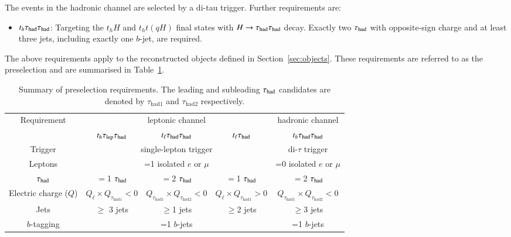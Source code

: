 The events in the hadronic channel are selected by a di-tau trigger. Further requirements are:
\begin{itemize}
\item $t_h\tau_{\mathrm{had}} \tau_{\mathrm{had}}$: Targeting the $t_hH$ and $t_ht(qH)$ final states with $H\rightarrow\tau_{\mathrm{had}} \tau_{\mathrm{had}}$ decay. Exactly two $\tau_{\mathrm{had}}$ with opposite-sign charge and at least three jets, including exactly one $b$-jet, are required.
\end{itemize}

The above requirements apply to the reconstructed objects defined in Section~\ref{sec:objects}.
These requirements are referred to as the preselection and are summarised in Table~\ref{tab:preselection}. 

\begin{table*}[t!]
\caption{\small{Summary of preselection requirements. 
The leading and subleading $\tau_{\mathrm{had}}$ candidates are denoted by $\tau_{\mathrm{had1}}$ and $\tau_{\mathrm{had2}}$ respectively.}}
\begin{center}
\begin{tabular}{c|ccc|c}
\toprule\toprule
\multirow{2}{*}{Requirement} &  \multicolumn{3}{c|}{leptonic channel}  & \multicolumn{1}{c}{hadronic channel} \\ 
& $t_h\tau_{\mathrm{lep}} \tau_{\mathrm{had}}$ & $t_{\ell}\tau_{\mathrm{had}} \tau_{\mathrm{had}}$ &  $t_{\ell}\tau_{\mathrm{had}}$ & $t_h\tau_{\mathrm{had}} \tau_{\mathrm{had}}$\\
\midrule
Trigger & \multicolumn{3}{c|}{single-lepton trigger} & di-$\tau$ trigger  \\
Leptons  & \multicolumn{3}{c|}{=1 isolated $e$ or $\mu$}  & =0 isolated $e$ or $\mu$ \\
$\tau_{\mathrm{had}}$  & $=$1 $\tau_{\mathrm{had}}$ & $=$2 $\tau_{\mathrm{had}}$ & $=$1 $\tau_{\mathrm{had}}$ & $=$2 $\tau_{\mathrm{had}}$ \\
Electric charge ($Q$) & $Q_\ell \times Q_{\tau_{\mathrm{had1}}} < 0$ & $Q_{\tau_{\mathrm{had1}}} \times Q_{\tau_{\mathrm{had2}}} < 0$ & $Q_\ell \times Q_{\tau_{\mathrm{had1}}} > 0$ & $Q_{\tau_{\mathrm{had1}}} \times Q_{\tau_{\mathrm{had2}}} < 0$ \\
Jets  &   $\geq$ 3 jets & $\geq$1 jets & $\geq$2 jets & $\geq$3 jets \\
$b$-tagging & \multicolumn{3}{c|}{=1 $b$-jets} & =1 $b$-jets\\
\bottomrule\bottomrule
\end{tabular}
\label{tab:preselection}
\end{center}
\end{table*}
